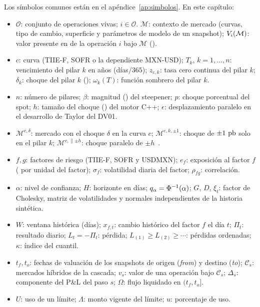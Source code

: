 Los símbolos comunes están en el apéndice~\ref{ap:simbolos}. En este capítulo:
\begin{itemize}
  \item $\mathcal O$: conjunto de operaciones vivas; $i\in\mathcal O$. $\mathcal M$: contexto de mercado (curvas,
        tipo de cambio, superficie y parámetros de modelo de un snapshot); $V_i(\mathcal M)$: valor presente
        en \MXN{} de la operación $i$ bajo $\mathcal M$ ().
  \item $c$: curva (TIIE-F, SOFR o la dependiente MXN-USD); $T_k$, $k=1,\dots,n$: vencimiento del pilar $k$
        en años (días$/365$); $z_{c,k}$: tasa cero continua del pilar $k$; $\delta_k$: choque del pilar $k$ (\pb);
        $\omega_k(T)$: función sombrero del pilar $k$.
  \item $n$: número de pilares; $\beta$: magnitud (\pb) del steepener; $p$: choque porcentual del spot; $h$: tamaño del choque (\pb) del motor C++; $\epsilon$: desplazamiento paralelo en el desarrollo de Taylor del DV01.
  \item $\mathcal M^{c,\delta}$: mercado con el choque $\delta$ en la curva $c$; $\mathcal M^{c,k,\pm1}$: choque de
        $\pm1~\textup{pb}$ solo en el pilar $k$; $\mathcal M^{c,\parallel\pm h}$: choque paralelo de $\pm h$~\pb.
  \item $f,g$: factores de riesgo (TIIE-F, SOFR y USDMXN); $e_f$: exposición al factor $f$ (\MXN{} por unidad
        del factor); $\sigma_f$: volatilidad diaria del factor; $\rho_{fg}$: correlación.
  \item $\alpha$: nivel de confianza; $H$: horizonte en días; $q_\alpha=\Phi^{-1}(\alpha)$; $G$, $D$, $\xi_t$: factor de Cholesky, matriz de volatilidades y normales independientes de la historia sintética.
  \item $W$: ventana histórica (días); $x_{f,t}$: cambio histórico del factor $f$ el día $t$; $\Pi_t$: resultado
        diario; $L_t=-\Pi_t$: pérdida; $L_{(1)}\ge L_{(2)}\ge\cdots$: pérdidas ordenadas; $\kappa$: índice del cuantil.
  \item $t_f,t_o$: fechas de valuación de los snapshots de origen (\emph{from}) y destino (\emph{to}); $\mathcal C_s$:
        mercados híbridos de la cascada; $v_s$: valor de una operación bajo $\mathcal C_s$; $\Delta_s$: componente del P\&L del paso $s$; $\Omega$: flujo liquidado en
        $(t_f,t_o]$.
  \item $U$: uso de un límite; $\Lambda$: monto vigente del límite; $u$: porcentaje de uso.
\end{itemize}

